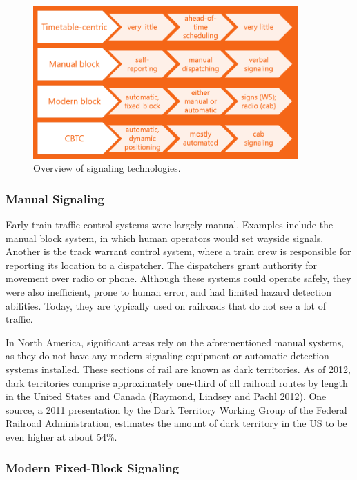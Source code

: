 \documentclass[11pt, titlepage]{article}
\begin{document}
\begin{figure}[ht]
    \begin{center}
        \includegraphics[width=4in]{SignalingTechnologies.png}
        \caption{Overview of signaling technologies.}
    \end{center}
\end{figure}

\subsubsection{Manual Signaling}

Early train traffic control systems were largely manual. Examples include the
manual block system, in which human operators would set wayside signals. Another is
the track warrant control system, where a train crew is responsible for reporting
its location to a dispatcher. The dispatchers grant authority for movement over
radio or phone. Although these systems could operate safely, they were also
inefficient, prone to human error, and had limited hazard detection abilities.
Today, they are typically used on railroads that do not see a lot of traffic.

In North America, significant areas rely on the aforementioned manual systems, as
they do not have any modern signaling equipment or automatic detection systems
installed. These sections of rail are known as dark territories. As of 2012, dark
territories comprise approximately one-third of all railroad routes by length in
the United States and Canada (Raymond, Lindsey and Pachl 2012). One source, a 2011
presentation by the Dark Territory Working Group of the Federal Railroad
Administration, estimates the amount of dark territory in the US to be even higher
at about 54\%.

\subsubsection{Modern Fixed-Block Signaling}
\end{document}
